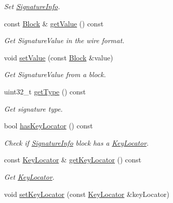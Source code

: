 \begin{DoxyCompactItemize}
\begin{DoxyCompactList}\small\item\em Set \hyperlink{classndn_1_1SignatureInfo}{Signature\+Info}. \end{DoxyCompactList}\item 
const \hyperlink{classndn_1_1Block}{Block} \& \hyperlink{classndn_1_1Signature_a58d707d8fbaedeba54f9572faa3a1333}{get\+Value} () const\hypertarget{classndn_1_1Signature_a58d707d8fbaedeba54f9572faa3a1333}{}\label{classndn_1_1Signature_a58d707d8fbaedeba54f9572faa3a1333}

\begin{DoxyCompactList}\small\item\em Get Signature\+Value in the wire format. \end{DoxyCompactList}\item 
void \hyperlink{classndn_1_1Signature_af05df098210e986687abb196cbdb8b92}{set\+Value} (const \hyperlink{classndn_1_1Block}{Block} \&value)
\begin{DoxyCompactList}\small\item\em Get Signature\+Value from a block. \end{DoxyCompactList}\item 
uint32\+\_\+t \hyperlink{classndn_1_1Signature_a8a6f9cd01c78d530652caa8f98926751}{get\+Type} () const\hypertarget{classndn_1_1Signature_a8a6f9cd01c78d530652caa8f98926751}{}\label{classndn_1_1Signature_a8a6f9cd01c78d530652caa8f98926751}

\begin{DoxyCompactList}\small\item\em Get signature type. \end{DoxyCompactList}\item 
bool \hyperlink{classndn_1_1Signature_ab194076d9b50f42687f684e7d7cbdbcb}{has\+Key\+Locator} () const\hypertarget{classndn_1_1Signature_ab194076d9b50f42687f684e7d7cbdbcb}{}\label{classndn_1_1Signature_ab194076d9b50f42687f684e7d7cbdbcb}

\begin{DoxyCompactList}\small\item\em Check if \hyperlink{classndn_1_1SignatureInfo}{Signature\+Info} block has a \hyperlink{classndn_1_1KeyLocator}{Key\+Locator}. \end{DoxyCompactList}\item 
const \hyperlink{classndn_1_1KeyLocator}{Key\+Locator} \& \hyperlink{classndn_1_1Signature_acccb3dbc17f32f4abc7c4cbb19395448}{get\+Key\+Locator} () const
\begin{DoxyCompactList}\small\item\em Get \hyperlink{classndn_1_1KeyLocator}{Key\+Locator}. \end{DoxyCompactList}\item 
void \hyperlink{classndn_1_1Signature_af4ff2d73719170f7a4e26db5a5598b30}{set\+Key\+Locator} (const \hyperlink{classndn_1_1KeyLocator}{Key\+Locator} \&key\+Locator)\hypertarget{classndn_1_1Signature_af4ff2d73719170f7a4e26db5a5598b30}{}\label{classndn_1_1Signature_af4ff2d73719170f7a4e26db5a5598b30}


\end{DoxyCompactItemize}
